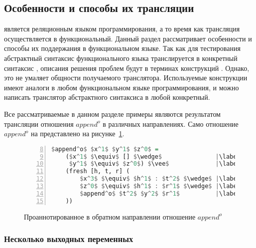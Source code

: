 \subsection{Особенности \miniKanren{} и способы их трансляции}

\miniKanren является реляционным языком программирования, а то время как трансляция осуществляется в функциональный.
Данный раздел рассматривает особенности \miniKanren{} и способы их поддержания в функциональном языке.
Так как для тестирования абстрактный синтаксис функционального языка транслируется в конкретный синтаксис \haskell{}, описания решения проблем будут в терминах конструкций \haskell{}.
Однако, это не умаляет общности получаемого транслятора.
Используемые конструкции имеют аналоги в любом функциональном языке программирования, и можно написать транслятор абстрактного синтаксиса в любой конкретный.

Все рассматриваемые в данном разделе примеры являются результатом трансляции отношения $append^o$ в различных направлениях.
Само отношение $append^o$ на \miniKanren{} представлено на рисунке~\ref{lst:appendoOOIANN}.

\begin{figure}[h!]
  \begin{center}
  \begin{minipage}{0.4\textwidth}
  \begin{lstlisting}[language=Haskell, frame=single, numbers=left,numberstyle=\small, firstnumber=8, escapechar=|]
  $append^o$ $x^1$ $y^1$ $z^0$ =
    ($x^1$ $\equiv$ [] $\wedge$               |\label{line:appendoOOIANN2}|
     $y^1$ $\equiv$ $z^0$) $\vee$             |\label{line:appendoOOIANN3}|
    (fresh [h, t, r] (
        $x^3$ $\equiv$ $h^1$ : $t^2$ $\wedge$ |\label{line:appendoOOIANN4}|
        $z^0$ $\equiv$ $h^1$ : $r^1$ $\wedge$ |\label{line:appendoOOIANN5}|
        $append^o$ $t^2$ $y^2$ $r^1$          |\label{line:appendoOOIANN6}|
    ))
    \end{lstlisting}
  \end{minipage}
  \end{center}
  \caption{Проаннотированное в обратном направлении отношение $append^o$}
  \label{lst:appendoOOIANN}
\end{figure}


\subsubsection{Несколько выходных переменных}

